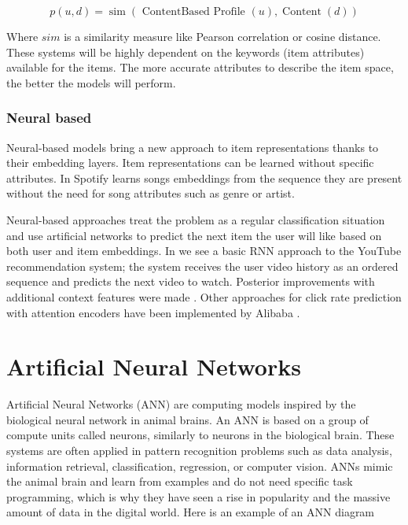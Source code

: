 \documentclass{kththesis}
\begin{document}
\begin{equation}
p(u, d)=\operatorname{sim}(\text { ContentBased Profile }(u), \operatorname{Content}(d))
\end{equation}

Where $sim$ is a similarity measure like Pearson correlation or cosine distance.
These systems will be highly dependent on the keywords (item attributes) available for the items. The more accurate attributes to describe the item space, the better the models will perform.

\subsubsection{Neural based}
Neural-based models bring a new approach to item representations \cite{content-embeddings} thanks to their embedding layers. Item representations can be learned without specific attributes. In \cite{spotifyembeddings} Spotify learns songs embeddings from the sequence they are present without the need for song attributes such as genre or artist.

Neural-based approaches treat the problem as a regular classification situation and use artificial networks to predict the next item the user will like based on both user and item embeddings. In \cite{rnn-youtube} we see a basic RNN approach to the YouTube recommendation system; the system receives the user video history as an ordered sequence and predicts the next video to watch. Posterior improvements with additional context features were made \cite{rnn-youtube-improved}. Other approaches for click rate prediction with attention encoders have been implemented by Alibaba \cite{alibaba}.

\section{Artificial Neural Networks}
Artificial Neural Networks (ANN) are computing models inspired by the biological neural network in animal brains. An ANN is based on a group of compute units called neurons, similarly to neurons in the biological brain. These systems are often applied in pattern recognition \cite{pattern-bishop} problems such as data analysis, information retrieval, classification, regression, or computer vision. ANNs mimic the animal brain and learn from examples and do not need specific task programming, which is why they have seen a rise in popularity and the massive amount of data in the digital world. Here is an example of an ANN diagram
\end{document}
